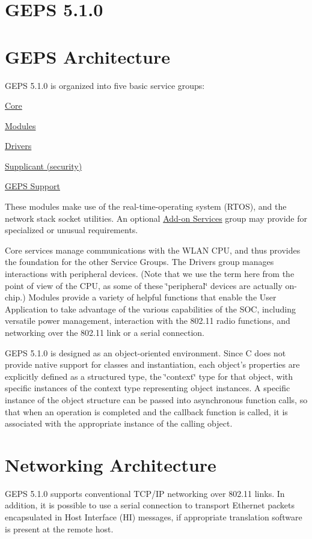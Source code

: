 \hypertarget{main_geps-main}{}\section{GEPS 5.1.0}\label{main_geps-main}
\hypertarget{main_mainpage-geps-architecture}{}\section{GEPS Architecture}\label{main_mainpage-geps-architecture}
GEPS 5.1.0 is organized into five basic service groups:


\begin{DoxyItemize}
\item \hyperlink{a00681}{Core}
\item \hyperlink{a00685}{Modules}
\item \hyperlink{a00682}{Drivers}
\item \hyperlink{a00683}{Supplicant (security)}
\item \hyperlink{a00684}{GEPS Support}
\end{DoxyItemize}



These modules make use of the real-\/time-\/operating system (RTOS), and the network stack socket utilities. An optional \hyperlink{a00680}{Add-\/on Services} group may provide for specialized or unusual requirements.

Core services manage communications with the WLAN CPU, and thus provides the foundation for the other Service Groups. The Drivers group manages interactions with peripheral devices. (Note that we use the term here from the point of view of the CPU, as some of these \char`\"{}peripheral\char`\"{} devices are actually on-\/chip.) Modules provide a variety of helpful functions that enable the User Application to take advantage of the various capabilities of the SOC, including versatile power management, interaction with the 802.11 radio functions, and networking over the 802.11 link or a serial connection.

GEPS 5.1.0 is designed as an object-\/oriented environment. Since C does not provide native support for classes and instantiation, each object's properties are explicitly defined as a structured type, the \char`\"{}context\char`\"{} type for that object, with specific instances of the context type representing object instances. A specific instance of the object structure can be passed into asynchronous function calls, so that when an operation is completed and the callback function is called, it is associated with the appropriate instance of the calling object.\hypertarget{main_mainpage-networking-architecture}{}\section{Networking Architecture}\label{main_mainpage-networking-architecture}
GEPS 5.1.0 supports conventional TCP/IP networking over 802.11 links. In addition, it is possible to use a serial connection to transport Ethernet packets encapsulated in Host Interface (HI) messages, if appropriate translation software is present at the remote host.

